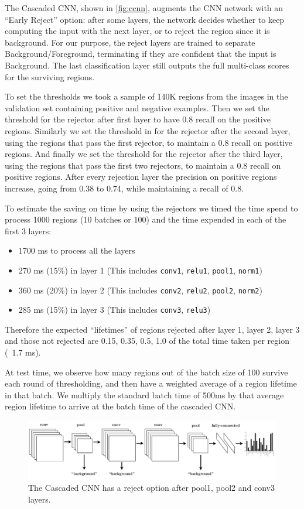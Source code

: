 The Cascaded CNN, shown in \autoref{fig:ccnn}, augments the CNN network with an ``Early Reject'' option: after some layers, the network decides whether to keep computing the input with the next layer, or to reject the region since it is background.
For our purpose, the reject layers are trained to separate Background/Foreground, terminating if they are confident that the input is Background. The last classification layer still outputs the full multi-class scores for the surviving regions.

To set the thresholds we took a sample of 140K regions from the images in the validation set containing positive and negative examples. Then we set the threshold for the rejector after first layer to have 0.8 recall on the positive regions. Similarly we set the threshold in for the rejector after the second layer, using the regions that pass the first rejector, to maintain a 0.8 recall on positive regions. And finally we set the threshold for the rejector after the third layer, using the regions that pass the first two rejectors, to maintain a 0.8 recall on positive regions. After every rejection layer the precision on positive regions increase, going from 0.38 to 0.74, while maintaining a recall of 0.8.

To estimate the saving on time by using the rejectors we timed the time spend to process 1000 regions (10 batches or 100) and the time expended in each of the first 3 layers:

\begin{itemize}
\item 1700 ms to process all the layers
\item 270 ms (15\%) in layer 1 (This includes \texttt{conv1}, \texttt{relu1}, \texttt{pool1}, \texttt{norm1})
\item 360 ms (20\%) in layer 2 (This includes \texttt{conv2}, \texttt{relu2}, \texttt{pool2}, \texttt{norm2})
\item 285 ms (15\%) in layer 3 (This includes \texttt{conv3}, \texttt{relu3})
\end{itemize}

Therefore the expected ``lifetimes'' of regions rejected after layer 1, layer 2, layer 3 and those not rejected are  0.15, 0.35, 0.5, 1.0 of the total time taken per region (~1.7 ms).

At test time, we observe how many regions out of the batch size of 100 survive each round of thresholding, and then have a weighted average of a region lifetime in that batch. We multiply the standard batch time of 500ms by that average region lifetime to arrive at the batch time of the cascaded CNN.

\begin{figure}[h!]
\begin{center}
\includegraphics[width=0.98\columnwidth]{figures/ccnn.pdf}
\caption{
The Cascaded CNN has a reject option after pool1, pool2 and conv3 layers.
}\label{fig:ccnn}
\end{center}
\end{figure}
